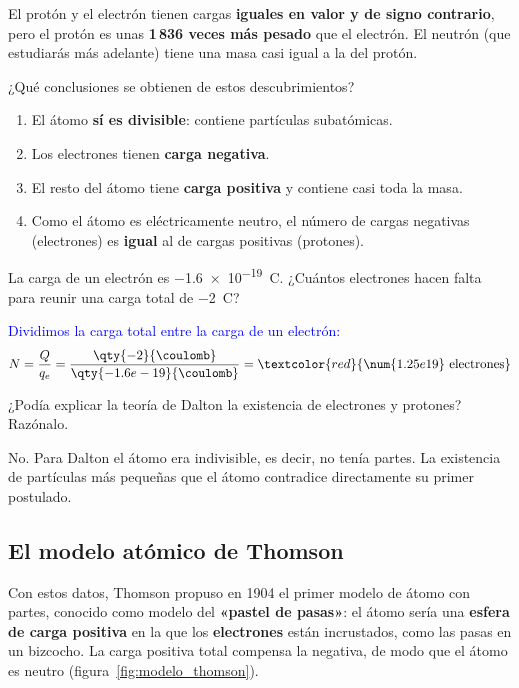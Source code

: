 \begin{remark}
    El protón y el electrón tienen cargas \textbf{iguales en valor y de signo contrario}, pero el protón es unas \textbf{1\,836 veces más pesado} que el electrón. El neutrón (que estudiarás más adelante) tiene una masa casi igual a la del protón.
\end{remark}

¿Qué conclusiones se obtienen de estos descubrimientos?
\begin{enumerate}[label=\numberballgreen]
    \item El átomo \textbf{sí es divisible}: contiene partículas subatómicas.
    \item Los electrones tienen \textbf{carga negativa}.
    \item El resto del átomo tiene \textbf{carga positiva} y contiene casi toda la masa.
    \item Como el átomo es eléctricamente neutro, el número de cargas negativas (electrones) es \textbf{igual} al de cargas positivas (protones).
\end{enumerate}

\begin{exercise}
    La carga de un electrón es \qty{-1.6e-19}{\coulomb}. ¿Cuántos electrones hacen falta para reunir una carga total de \qty{-2}{\coulomb}?
    \begin{solu}
        \textcolor{blue}{Dividimos la carga total entre la carga de un electrón:}
        \[ N = \frac{Q}{q_e} = \frac{\qty{-2}{\coulomb}}{\qty{-1.6e-19}{\coulomb}} = \textcolor{red}{\num{1.25e19}\ \text{electrones}} \]
    \end{solu}
\end{exercise}

\begin{exercise}
    ¿Podía explicar la teoría de Dalton la existencia de electrones y protones? Razónalo.
    \begin{solu}
        No. Para Dalton el átomo era indivisible, es decir, no tenía partes. La existencia de partículas más pequeñas que el átomo contradice directamente su primer postulado.
    \end{solu}
\end{exercise}

\subsection{El modelo atómico de Thomson}

Con estos datos, Thomson propuso en 1904 el primer modelo de átomo con partes, conocido como modelo del \textbf{«pastel de pasas»}: el átomo sería una \textbf{esfera de carga positiva} en la que los \textbf{electrones} están incrustados, como las pasas en un bizcocho. La carga positiva total compensa la negativa, de modo que el átomo es neutro (figura~\ref{fig:modelo_thomson}).


